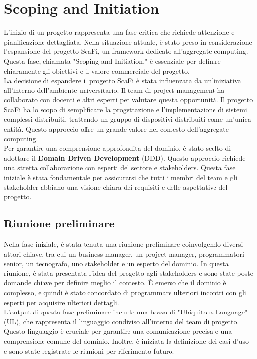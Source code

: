 \section{Scoping and Initiation}

L'inizio di un progetto rappresenta una fase critica che richiede attenzione e pianificazione dettagliata.
Nella situazione attuale, è stato preso in considerazione l'espansione del progetto ScaFi, un framework
dedicato all'aggregate computing. Questa fase, chiamata "Scoping and Initiation," è essenziale per definire
chiaramente gli obiettivi e il valore commerciale del progetto.\\

La decisione di espandere il progetto ScaFi è stata influenzata da un'iniziativa all'interno dell'ambiente
universitario. Il team di project management ha collaborato con docenti e altri esperti per valutare questa
opportunità. Il progetto ScaFi ha lo scopo di semplificare la progettazione e l'implementazione di sistemi
complessi distribuiti, trattando un gruppo di dispositivi distribuiti come un'unica entità.
Questo approccio offre un grande valore nel contesto dell'aggregate computing.\\

Per garantire una comprensione approfondita del dominio, è stato scelto di adottare il
\textbf{Domain Driven Development} (DDD). Questo approccio richiede una stretta collaborazione con esperti
del settore e stakeholders. Questa fase iniziale è stata fondamentale per assicurarsi che tutti i membri
del team e gli stakeholder abbiano una visione chiara dei requisiti e delle aspettative del progetto.\\

\subsection{Riunione preliminare}
Nella fase iniziale, è stata tenuta una riunione preliminare coinvolgendo diversi attori chiave, tra cui un
business manager, un project manager, programmatori senior, un tecnografo, uno stakeholder e un esperto del
dominio. In questa riunione, è stata presentata l'idea del progetto agli stakeholders e sono state poste
domande chiave per definire meglio il contesto. È emerso che il dominio è complesso, e quindi è stato
concordato di programmare ulteriori incontri con gli esperti per acquisire ulteriori dettagli.\\

L'output di questa fase preliminare include una bozza di "Ubiquitous Language" (UL), che rappresenta il
linguaggio condiviso all'interno del team di progetto. Questo linguaggio è cruciale per garantire una
comunicazione precisa e una comprensione comune del dominio. Inoltre, è iniziata la definizione dei casi
d'uso e sono state registrate le riunioni per riferimento futuro.\\


